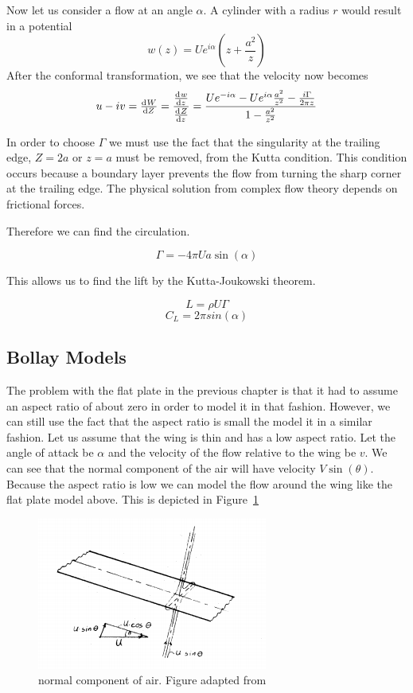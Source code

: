 Now let us consider a flow at an angle $\alpha$. A cylinder with a radius $r$
would result in a potential
\[w(z) = Ue^{i\alpha}(z + \frac{a^2}{z}) \]
After the conformal transformation, we see that the velocity now becomes
\[u - iv = \od{W}{Z} = \frac{\od{w}{z}}{\od{Z}{z}} = \frac{Ue^{-i\alpha}-Ue^{i\alpha}\frac{a^2}{z^2}
- \frac{i \Gamma}{2\pi z}}{1 - \frac{a^2}{z^2}}\]

In order to choose $\Gamma$ we must use the fact that the singularity at the trailing edge, 
$Z=2a$ or $z=a$ must be removed, from the Kutta condition. This condition occurs because 
a boundary layer prevents the flow from turning the sharp corner at the trailing edge.
The physical solution from complex flow theory depends on frictional forces.

Therefore we can find the circulation.

\[ \Gamma = -4\pi Ua \sin(\alpha) \]

This allows us to find the lift by the Kutta-Joukowski theorem.

\[L = \rho U \Gamma\]
\begin{equation}
\label{eq:flat_plat_cl}
C_L = 2\pi sin(\alpha)
\end{equation}

\subsection{Bollay Models}

The problem with the flat plate in the previous chapter is that it had to assume 
an aspect ratio of about zero in order to model it in that fashion. However, we can still
use the fact that the aspect ratio is small the model it in a similar fashion.
Let us assume that the wing is thin and has a low aspect ratio. Let the angle of attack
 be $\alpha$ and the velocity of the flow relative to the wing be $v$. 
 We can see that the normal component of the air
will have velocity $V\sin(\theta)$. Because the aspect ratio is low
we can model the flow around the wing like the flat plate model above.
This is depicted in Figure~\ref{fig:bollay1}

\begin{figure}[hl]
  \centering
    \includegraphics[scale=1]{figures/bollay1.png}
    \caption{normal component of air. Figure adapted from~\cite{bollay}}
  \label{fig:bollay1}
\end{figure}



